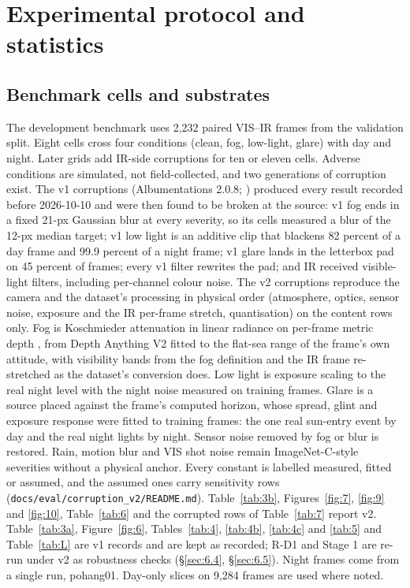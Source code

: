 \documentclass[10pt]{article}
\begin{document}
\section{Experimental protocol and statistics}\label{sec:5}
\subsection{Benchmark cells and substrates}\label{sec:5.1}
The development benchmark uses 2,232 paired VIS--IR frames from the validation split. Eight cells cross four conditions (clean, fog, low-light, glare) with day and night. Later grids add IR-side corruptions for ten or eleven cells. Adverse conditions are simulated, not field-collected, and two generations of corruption exist. The v1 corruptions (Albumentations 2.0.8; \citealp{buslaev2020albumentations}) produced every result recorded before 2026-10-10 and were then found to be broken at the source: v1 fog ends in a fixed 21-px Gaussian blur at every severity, so its cells measured a blur of the 12-px median target; v1 low light is an additive clip that blackens 82 percent of a day frame and 99.9 percent of a night frame; v1 glare lands in the letterbox pad on 45 percent of frames; every v1 filter rewrites the pad; and IR received visible-light filters, including per-channel colour noise. The v2 corruptions reproduce the camera and the dataset's processing in physical order (atmosphere, optics, sensor noise, exposure and the IR per-frame stretch, quantisation) on the content rows only. Fog is Koschmieder attenuation in linear radiance on per-frame metric depth \citep{sakaridis2018semantic}, from Depth Anything V2 \citep{yang2024depth} fitted to the flat-sea range of the frame's own attitude, with visibility bands from the fog definition and the IR frame re-stretched as the dataset's conversion does. Low light is exposure scaling to the real night level with the night noise measured on training frames. Glare is a source placed against the frame's computed horizon, whose spread, glint and exposure response were fitted to training frames: the one real sun-entry event by day and the real night lights by night. Sensor noise removed by fog or blur is restored. Rain, motion blur and VIS shot noise remain ImageNet-C-style severities \citep{hendrycks2019benchmarking} without a physical anchor. Every constant is labelled measured, fitted or assumed, and the assumed ones carry sensitivity rows (\texttt{docs/\allowbreak{}eval/\allowbreak{}corruption\_\allowbreak{}v2/\allowbreak{}README.md}). Table~\ref{tab:3b}, Figures~\ref{fig:7}, \ref{fig:9} and \ref{fig:10}, Table~\ref{tab:6} and the corrupted rows of Table~\ref{tab:7} report v2. Table~\ref{tab:3a}, Figure~\ref{fig:6}, Tables~\ref{tab:4}, \ref{tab:4b}, \ref{tab:4c} and \ref{tab:5} and Table~\ref{tab:L} are v1 records and are kept as recorded; R-D1 and Stage 1 are re-run under v2 as robustness checks (\S\ref{sec:6.4}, \S\ref{sec:6.5}). Night frames come from a single run, pohang01. Day-only slices on 9,284 frames are used where noted.
\end{document}

